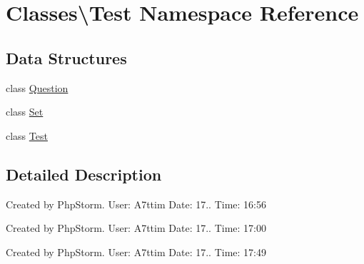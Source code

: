\hypertarget{namespace_classes_1_1_test}{}\section{Classes\textbackslash{}Test Namespace Reference}
\label{namespace_classes_1_1_test}
\subsection*{Data Structures}
\begin{DoxyCompactItemize}
\item 
class \hyperlink{class_classes_1_1_test_1_1_question}{Question}
\item 
class \hyperlink{class_classes_1_1_test_1_1_set}{Set}
\item 
class \hyperlink{class_classes_1_1_test_1_1_test}{Test}
\end{DoxyCompactItemize}


\subsection{Detailed Description}
Created by Php\+Storm. User\+: A7ttim Date\+: 17.. Time\+: 16\+:56

Created by Php\+Storm. User\+: A7ttim Date\+: 17.. Time\+: 17\+:00

Created by Php\+Storm. User\+: A7ttim Date\+: 17.. Time\+: 17\+:49 